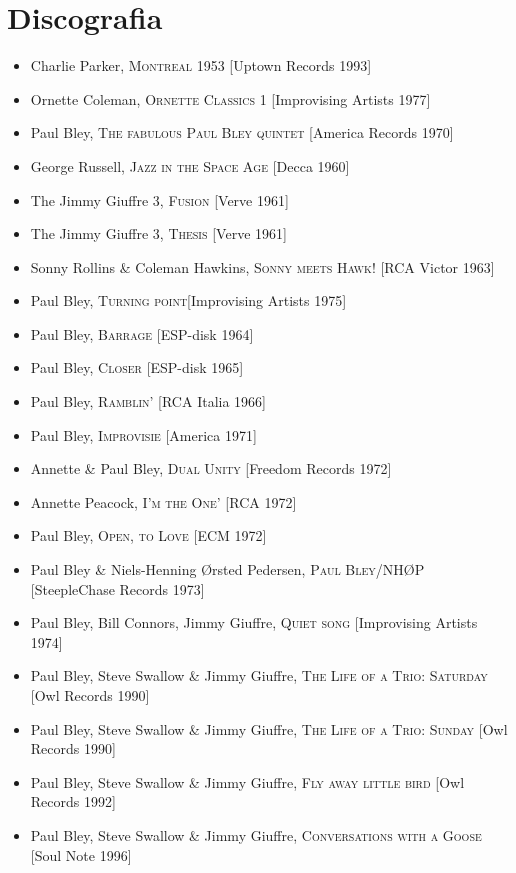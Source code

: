 \chapter*{Discografia}
\begin{itemize}
	\item Charlie Parker, \textsc{Montreal 1953} [Uptown Records 1993]
	\item Ornette Coleman, \textsc{Ornette Classics 1} [Improvising Artists 1977]
	\item Paul Bley, \textsc{The fabulous Paul Bley quintet} [America Records 1970]
	\item George Russell, \textsc{Jazz in the Space Age} [Decca 1960]
	\item The Jimmy Giuffre 3, \textsc{Fusion} [Verve 1961]
	\item The Jimmy Giuffre 3, \textsc{Thesis} [Verve 1961]
	\item Sonny Rollins \& Coleman Hawkins, \textsc{Sonny meets Hawk!} [RCA Victor 1963]
	\item Paul Bley, \textsc{Turning point}[Improvising Artists 1975]
	\item Paul Bley, \textsc{Barrage} [ESP-disk 1964] 
	\item Paul Bley, \textsc{Closer} [ESP-disk 1965] 
	\item Paul Bley, \textsc{Ramblin'} [RCA Italia 1966]
	\item Paul Bley, \textsc{Improvisie} [America 1971]
	\item Annette \& Paul Bley, \textsc{Dual Unity} [Freedom Records 1972]
	\item Annette Peacock, \textsc{I'm the One'} [RCA 1972]
	\item Paul Bley, \textsc{Open, to Love} [ECM 1972]
	\item Paul Bley \& Niels-Henning Ørsted Pedersen, \textsc{Paul Bley/NHØP} [SteepleChase Records 1973]
	\item Paul Bley, Bill Connors, Jimmy Giuffre, \textsc{Quiet song} [Improvising Artists 1974]
	\item Paul Bley, Steve Swallow \& Jimmy Giuffre, \textsc{The Life of a Trio: Saturday} [Owl Records 1990]
	\item Paul Bley, Steve Swallow \& Jimmy Giuffre, \textsc{The Life of a Trio: Sunday} [Owl Records 1990]
	\item Paul Bley, Steve Swallow \& Jimmy Giuffre, \textsc{Fly away little bird} [Owl Records 1992]
	\item Paul Bley, Steve Swallow \& Jimmy Giuffre, \textsc{Conversations with a Goose} [Soul Note 1996]
\end{itemize}